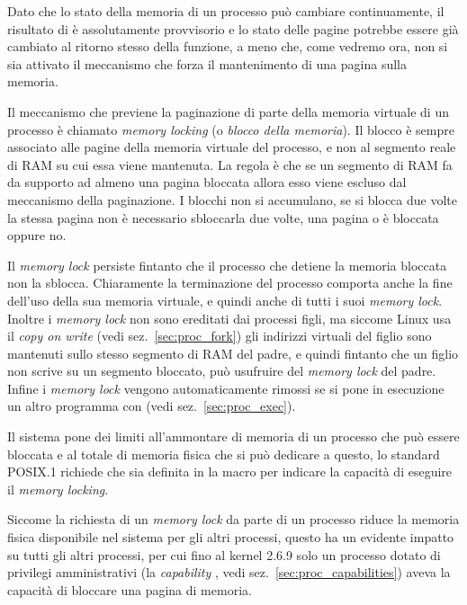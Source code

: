 Dato che lo stato della memoria di un processo può cambiare continuamente, il
risultato di  è assolutamente provvisorio e lo stato delle
pagine potrebbe essere già cambiato al ritorno stesso della funzione, a meno
che, come vedremo ora, non si sia attivato il meccanismo che forza il
mantenimento di una pagina sulla memoria.  


Il meccanismo che previene la paginazione di parte della memoria virtuale di
un processo è chiamato \textit{memory locking} (o \textsl{blocco della
  memoria}). Il blocco è sempre associato alle pagine della memoria virtuale
del processo, e non al segmento reale di RAM su cui essa viene mantenuta.  La
regola è che se un segmento di RAM fa da supporto ad almeno una pagina
bloccata allora esso viene escluso dal meccanismo della paginazione. I blocchi
non si accumulano, se si blocca due volte la stessa pagina non è necessario
sbloccarla due volte, una pagina o è bloccata oppure no.

Il \textit{memory lock} persiste fintanto che il processo che detiene la
memoria bloccata non la sblocca. Chiaramente la terminazione del processo
comporta anche la fine dell'uso della sua memoria virtuale, e quindi anche di
tutti i suoi \textit{memory lock}.  Inoltre i \textit{memory lock} non sono
ereditati dai processi figli, ma siccome Linux usa il \textit{copy on write}
(vedi sez.~\ref{sec:proc_fork}) gli indirizzi virtuali del figlio sono
mantenuti sullo stesso segmento di RAM del padre, e quindi fintanto che un
figlio non scrive su un segmento bloccato, può usufruire del \textit{memory
  lock} del padre. Infine i \textit{memory lock} vengono automaticamente
rimossi se si pone in esecuzione un altro programma con  (vedi
sez.~\ref{sec:proc_exec}).

Il sistema pone dei limiti all'ammontare di memoria di un processo che può
essere bloccata e al totale di memoria fisica che si può dedicare a questo, lo
standard POSIX.1 richiede che sia definita in  la macro
 per indicare la capacità di eseguire il
\textit{memory locking}.

Siccome la richiesta di un \textit{memory lock} da parte di un processo riduce
la memoria fisica disponibile nel sistema per gli altri processi, questo ha un
evidente impatto su tutti gli altri processi, per cui fino al kernel 2.6.9
solo un processo dotato di privilegi amministrativi (la \textit{capability}
, vedi sez.~\ref{sec:proc_capabilities}) aveva la
capacità di bloccare una pagina di memoria.

